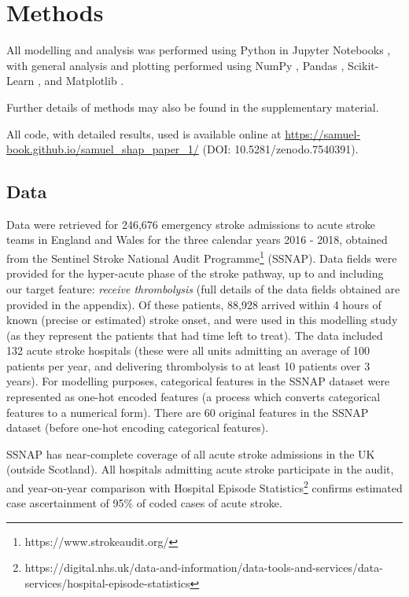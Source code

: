 \renewcommand{\thefootnote}{\alph{footnote}} %

\section{Methods}

All modelling and analysis was performed using Python in Jupyter Notebooks \cite{kluyver_jupyter_2016}, with general analysis and plotting performed using NumPy \cite{harris_array_2020}, Pandas \cite{mckinney-proc-scipy-2010}, Scikit-Learn  \cite{pedregosa_scikit-learn_2011}, and Matplotlib \cite{hunter_matplotlib_2007}. 

Further details of methods may also be found in the supplementary material. 

All code, with detailed results, used is available online at \url{https://samuel-book.github.io/samuel_shap_paper_1/} (DOI: 10.5281/zenodo.7540391). 

\subsection{Data}

Data were retrieved for 246,676 emergency stroke admissions to acute stroke teams in England and Wales for the three calendar years 2016 - 2018, obtained from the Sentinel Stroke National Audit Programme\footnote{https://www.strokeaudit.org/} (SSNAP). Data fields were provided for the hyper-acute phase of the stroke pathway, up to and including our target feature: \emph{receive thrombolysis} (full details of the data fields obtained are provided in the appendix). Of these patients, 88,928 arrived within 4 hours of known (precise or estimated) stroke onset, and were used in this modelling study (as they represent the patients that had time left to treat). The data included 132 acute stroke hospitals (these were all units admitting an average of 100 patients per year, and delivering thrombolysis to at least 10 patients over 3 years). For modelling purposes, categorical features in the SSNAP dataset were represented as one-hot encoded features (a process which converts categorical features to a numerical form). There are 60 original features in the SSNAP dataset (before one-hot encoding categorical features).

 SSNAP has near-complete coverage of all acute stroke admissions in the UK (outside Scotland). All hospitals admitting acute stroke participate in the audit, and year-on-year comparison with Hospital Episode Statistics\footnote{https://digital.nhs.uk/data-and-information/data-tools-and-services/data-services/hospital-episode-statistics} confirms estimated case ascertainment of 95\% of coded cases of acute stroke.

